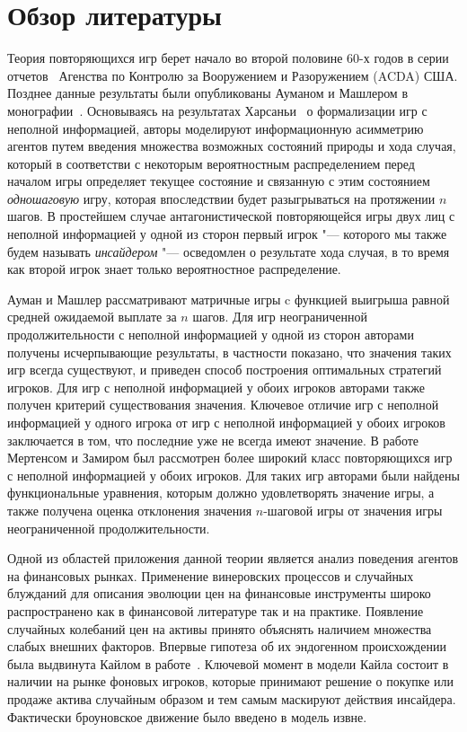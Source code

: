 \chapter*{Обзор литературы}

Теория повторяющихся игр берет начало во второй половине 60-х годов в серии
отчетов~\cite{r:aumann66, r:aumann67, r:aumann68a, r:aumann68b, r:stearns67}
Агенства по Контролю за Вооружением и Разоружением (ACDA) США. Позднее данные
результаты были опубликованы Ауманом и Машлером в монографии~\cite{aumann95}.
Основываясь на результатах Харсаньи~\cite{harsanyi67} о формализации игр с
неполной информацией, авторы моделируют информационную асимметрию агентов путем
введения множества возможных состояний природы и хода случая, который в
соответстви с некоторым вероятностным распределением перед началом игры
определяет текущее состояние и связанную с этим состоянием \emph{одношаговую}
игру, которая впоследствии будет разыгрываться на протяжении $n$ шагов. В
простейшем случае антагонистической повторяющейся игры двух лиц с неполной
информацией у одной из сторон первый игрок "--- которого мы также будем называть
\emph{инсайдером} "--- осведомлен о результате хода случая, в то время как
второй игрок знает только вероятностное распределение.

Ауман и Машлер рассматривают матричные игры c функцией выигрыша равной средней
ожидаемой выплате за $n$ шагов. Для игр неограниченной продолжительности с
неполной информацией у одной из сторон авторами получены исчерпывающие
результаты, в частности показано, что значения таких игр всегда существуют, и
приведен способ построения оптимальных стратегий игроков. Для игр с неполной
информацией у обоих игроков авторами также получен критерий существования
значения. Ключевое отличие игр с неполной информацией у одного игрока от игр с
неполной информацией у обоих игроков заключается в том, что последние уже не
всегда имеют значение. В работе~\cite{mertens71} Мертенсом и Замиром был
рассмотрен более широкий класс повторяющихся игр с неполной информацией у обоих
игроков. Для таких игр авторами были найдены функциональные уравнения, которым
должно удовлетворять значение игры, а также получена оценка отклонения значения
$n$-шаговой игры от значения игры неограниченной продолжительности.

Одной из областей приложения данной теории является анализ поведения агентов на
финансовых рынках. Применение винеровских процессов и случайных блужданий для
описания эволюции цен на финансовые инструменты широко распространено как в
финансовой литературе так и на практике. Появление случайных колебаний цен на
активы принято объяснять наличием множества слабых внешних факторов. Впервые
гипотеза об их эндогенном происхождении была выдвинута Кайлом в
работе~\cite{kyle85}. Ключевой момент в модели Кайла состоит в наличии на рынке
фоновых игроков, которые принимают решение о покупке или продаже актива
случайным образом и тем самым маскируют действия инсайдера. Фактически
броуновское движение было введено в модель извне.

